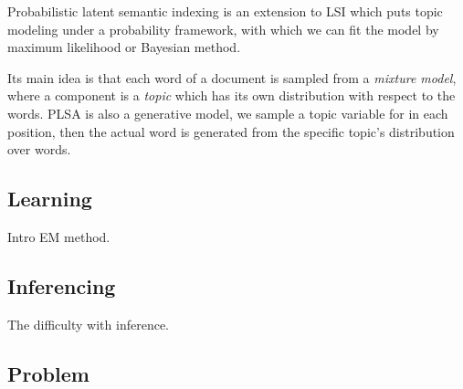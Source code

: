Probabilistic latent semantic indexing\cite{hofmann1999probabilistic} is an extension to LSI which puts topic modeling under a probability framework, with which we can fit the model by maximum likelihood or Bayesian method.

Its main idea is that each word of a document is sampled from a \emph{mixture model}, where a component is a \emph{topic} which has its own distribution with respect to the words. PLSA is also a generative model, we sample a topic variable for in each position, then the actual word is generated from the specific topic's distribution over words. 

\subsection{Learning}
Intro EM method.

\subsection{Inferencing}
The difficulty with inference. 

\subsection{Problem}